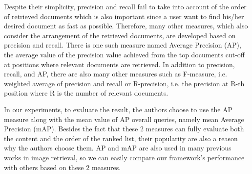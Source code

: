 Despite their simplicity, precision and recall fail to take into account of the order of retrieved documents which is also important since a user want to find his/her desired document as fast as possible. Therefore, many other measures, which also consider the arrangement of the retrieved documents, are developed based on precision and recall. There is one such measure named Average Precision (AP), the average value of the precision value achieved from the top documents cut-off at positions where relevant documents are retrieved. In addition to precision, recall, and AP, there are also many other measures such as F-measure, i.e. weighted average of precision and recall or R-precision, i.e. the precision at R-th position where R is the number of relevant documents.

In our experiments, to evaluate the result, the authors choose to use the AP measure along with the mean value of AP overall queries, namely mean Average Precision (mAP). Besides the fact that these 2 measures can fully evaluate both the content and the order of the ranked list, their popularity are also a reason why the authors choose them. AP and mAP are also used in many previous works in image retrieval, so we can easily compare our framework's performance with others based on these 2 measures.
